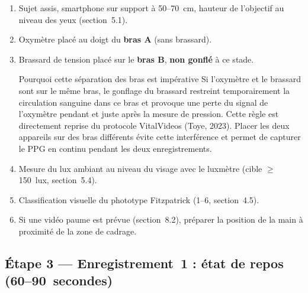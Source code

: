 \documentclass[11pt,a4paper]{article}
\begin{document}
\begin{enumerate}
\item Sujet assis, smartphone sur support \`a 50--70~cm, hauteur de
l'objectif au niveau des yeux (section~5.1).
\item Oxym\`etre plac\'e au doigt du \textbf{bras A} (sans brassard).
\item Brassard de tension plac\'e sur le \textbf{bras B}, \textbf{non
gonfl\'e} \`a ce stade.

\begin{warnbox}{Pourquoi cette s\'eparation des bras est imp\'erative}
Si l'oxym\`etre et le brassard sont sur le m\^eme bras, le gonflage du
brassard restreint temporairement la circulation sanguine dans ce bras et
provoque une perte du signal de l'oxym\`etre pendant et juste apr\`es la
mesure de pression. Cette r\`egle est directement reprise du protocole
VitalVideos (Toye, 2023). Placer les deux appareils sur des bras
diff\'erents \'evite cette interf\'erence et permet de capturer le PPG en
continu pendant les deux enregistrements.
\end{warnbox}

\item Mesure du lux ambiant au niveau du visage avec le luxm\`etre (cible
$\geq$150~lux, section~5.4).
\item Classification visuelle du phototype Fitzpatrick (1--6, section~4.5).
\item Si une vid\'eo paume est pr\'evue (section~8.2), pr\'eparer la
position de la main \`a proximit\'e de la zone de cadrage.
\end{enumerate}

\subsection{\'Etape 3 --- Enregistrement~1 : \'etat de repos
(60--90~secondes)}
\end{document}
